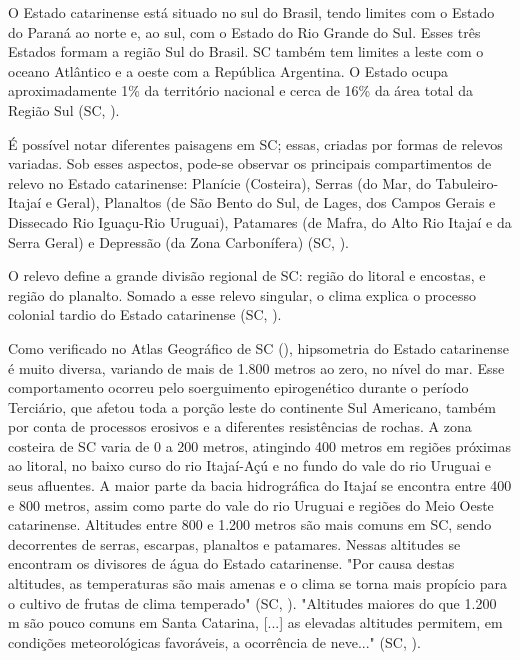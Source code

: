 \indent O Estado catarinense está situado no sul do Brasil, tendo limites com o Estado do Paraná ao norte e, ao sul, com o Estado do Rio Grande do Sul. Esses três Estados  formam a região Sul do Brasil. \acrlong{SC} também tem limites a leste com o oceano Atlântico e a oeste com a República Argentina.  O Estado ocupa aproximadamente 1\% da território nacional e  cerca de 16\% da área total da Região Sul (\acrlong{SC}, \citeyear{AtlasSCterritorio}).

\indent É possível notar diferentes paisagens em \acrlong{SC}; essas, criadas por formas de relevos variadas. Sob esses aspectos, pode-se observar os principais compartimentos de relevo no Estado catarinense: Planície (Costeira), Serras (do Mar, do Tabuleiro-Itajaí e Geral), Planaltos (de São Bento do Sul, de Lages, dos Campos Gerais e Dissecado Rio Iguaçu-Rio Uruguai), Patamares (de Mafra, do Alto Rio Itajaí e da Serra Geral) e Depressão (da Zona Carbonífera) (\acrlong{SC}, \citeyear{AtlasSCnatureza}).

\indent O relevo define a grande divisão regional de \acrlong{SC}: região do
litoral e encostas, e região do planalto. Somado a esse relevo singular, o clima explica o processo colonial tardio do Estado catarinense (\acrlong{SC}, \citeyear{AtlasSCpopulacao}).

\indent Como verificado no Atlas Geográfico de \acrlong{SC} (\citeyear{AtlasSCnatureza}), hipsometria do Estado catarinense é muito diversa, variando de mais de 1.800 metros ao zero, no nível do mar. Esse comportamento ocorreu pelo soerguimento epirogenético durante o período Terciário, que afetou toda a porção leste do continente Sul Americano, também por conta de processos erosivos e a diferentes resistências de rochas. A zona costeira de \acrlong{SC} varia de 0 a 200 metros, atingindo 400 metros em regiões próximas ao litoral, no baixo curso do rio Itajaí-Açú e no fundo do vale do rio Uruguai e seus afluentes. A maior parte da bacia hidrográfica do Itajaí se encontra entre 400 e 800 metros, assim como parte do vale do rio Uruguai e regiões do Meio Oeste catarinense. Altitudes entre 800 e 1.200 metros são mais comuns em \acrlong{SC}, sendo decorrentes de serras, escarpas, planaltos e patamares. Nessas altitudes se encontram os divisores de água do Estado catarinense. "Por causa destas altitudes, as temperaturas são mais amenas e o clima se torna mais propício para o cultivo de frutas de clima temperado" (\acrlong{SC}, \citeyear{AtlasSCnatureza}). "Altitudes maiores do que 1.200 m são pouco comuns em Santa Catarina, [...] as elevadas altitudes permitem, em condições meteorológicas favoráveis, a ocorrência de neve..." (\acrlong{SC}, \citeyear{AtlasSCnatureza}).

